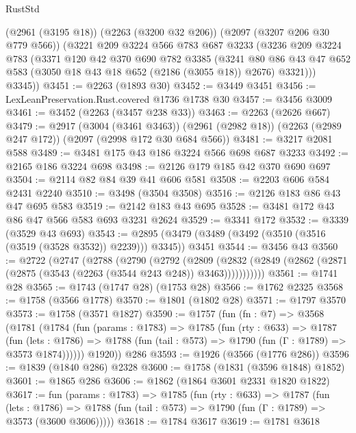 \begin{lexlean}{RustStd}
\begin{coremodule}
{\begin{coremodule}
{{{{{{{{{{{{{{{      (@2961 (@3195 @18))
      (@2263 (@3200 @32 @206))
      (@2097 (@3207 @206 @30 @779 @566))
      (@3221
        @209
        @3224
        @566
        @783
        @687
        @3233
        (@3236
          @209
          @3224
          @783
          (@3371
            @120
            @42
            @370
            @690
            @782
            @3385
            (@3241
              @80
              @86
              @43
              @47
              @652
              @583
              (@3050 @18 @43 @18 @652 (@2186 (@3055 @18)) @2676)
              @3321)))
        @3345))
@3451 := @2263 (@1893 @30)
@3452 := @3449 @3451
@3456 := LexLeanPreservation.Rust.covered @1736 @1738 @30
@3457 := @3456 @3009
@3461 := @3452 (@2263 (@3457 @238 @33))
@3463 := @2263 (@2626 @667)
@3479 := @2917
    (@3004 (@3461 @3463))
    (@2961 (@2982 @18))
    (@2263 (@2989 @247 @172))
    (@2097 (@2998 @172 @30 @684 @566))
@3481 := @3217 @2081 @588
@3489 := @3481 @175 @43 @186 @3224 @566 @698 @687 @3233
@3492 := @2165 @186 @3224 @698
@3498 := @2126 @179 @185 @42 @370 @690 @697
@3504 := @2114 @82 @84 @39 @41 @606 @581
@3508 := @2203 @606 @584 @2431 @2240
@3510 := @3498 (@3504 @3508)
@3516 := @2126 @183 @86 @43 @47 @695 @583
@3519 := @2142 @183 @43 @695
@3528 := @3481 @172 @43 @86 @47 @566 @583 @693 @3231 @2624
@3529 := @3341 @172
@3532 := @3339 (@3529 @43 @693)
@3543 := @2895 (@3479 (@3489 (@3492 (@3510 (@3516 (@3519 (@3528 @3532)) @2239))) @3345)) @3451
@3544 := @3456 @43
@3560 := @2722
    (@2747
      (@2788
        (@2790
          (@2792
            (@2809
              (@2832 (@2849 (@2862 (@2871 (@2875 (@3543 (@2263 (@3544 @243 @248)) @3463)))))))))))
@3561 := @1741 @28
@3565 := @1743 (@1747 @28) (@1753 @28)
@3566 := @1762 @2325
@3568 := @1758 (@3566 @1778)
@3570 := @1801 (@1802 @28)
@3571 := @1797 @3570
@3573 := @1758 (@3571 @1827)
@3590 := @1757
    (fun (fn : @7) =>
    @3568
      (@1781
        (@1784
          (fun (params : @1783) =>
          @1785
            (fun (rty : @633) =>
            @1787
              (fun (lets : @1786) =>
              @1788 (fun (tail : @573) => @1790 (fun (Γ : @1789) => @3573 @1874))))))
        @1920))
    @286
@3593 := @1926 (@3566 (@1776 @286))
@3596 := @1839 (@1840 @286) @2328
@3600 := @1758 (@1831 (@3596 @1848) @1852)
@3601 := @1865 @286
@3606 := @1862 (@1864 @3601 @2331 @1820 @1822)
@3617 := fun (params : @1783) =>
  @1785
    (fun (rty : @633) =>
    @1787
      (fun (lets : @1786) =>
      @1788 (fun (tail : @573) => @1790 (fun (Γ : @1789) => @3573 (@3600 @3606)))))
@3618 := @1784 @3617
@3619 := @1781 @3618
}}}}}}}}}}}}}}}
\end{coremodule}}
\end{coremodule}
\end{lexlean}
